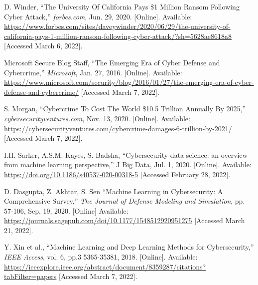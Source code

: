 \begin{thebibliography}{99}
    D. Winder, ``The University Of California Pays \$1 Million Ransom Following Cyber Attack,''
    \textit{forbes.com}, Jun. 29, 2020. [Online].
    Available: \href{https://www.forbes.com/sites/daveywinder/2020/06/29/the-university-of-california-pays-1-million-ransom-following-cyber-attack/?sh=5628ae8618a8}{https://www.forbes.com/sites/daveywinder/2020/06/29/the-university-of-california-pays-1-million-ransom-following-cyber-attack/?sh=5628ae8618a8}
    [Accessed March 6, 2022].

    Microsoft Secure Blog Staff, ``The Emerging Era of Cyber Defense and Cybercrime,''
    \textit{Microsoft}, Jan. 27, 2016. [Online].
    Available: \href{https://www.microsoft.com/security/blog/2016/01/27/the-emerging-era-of-cyber-defense-and-cybercrime/}{https://www.microsoft.com/security/blog/2016/01/27/the-emerging-era-of-cyber-defense-and-cybercrime/}
    [Accessed March 7, 2022].

    S. Morgan, ``Cybercrime To Cost The World \$10.5 Trillion Annually By 2025,''
    \textit{cybersecurityventures.com}, Nov. 13, 2020. [Online].
    Available: \href{https://cybersecurityventures.com/cybercrime-damages-6-trillion-by-2021/}{https://cybersecurityventures.com/cybercrime-damages-6-trillion-by-2021/}
    [Accessed March 7, 2022].

    I.H. Sarker, A.S.M. Kayes, S. Badsha, ``Cybersecurity data science: an overview from machine learning perspective,''
    J Big Data, Jul. 1, 2020. [Online].
    Available: \href{https://doi.org/10.1186/s40537-020-00318-5}{https://doi.org/10.1186/s40537-020-00318-5}
    [Accessed February 28, 2022].

    D. Dasgupta, Z. Akhtar, S. Sen ``Machine Learning in Cybersecurity: A Comprehensive Survey,''
    \textit{The Journal of Defense Modeling and Simulation}, pp. 57-106, Sep. 19, 2020. [Online]
    Available: \href{https://journals.sagepub.com/doi/10.1177/1548512920951275}{https://journals.sagepub.com/doi/10.1177/1548512920951275}
    [Accessed March 21, 2022].

    Y. Xin et al., ``Machine Learning and Deep Learning Methods for Cybersecurity,''
    \textit{IEEE Access}, vol. 6, pp.3 5365-35381, 2018. [Online].
    Available: \href{https://ieeexplore.ieee.org/abstract/document/8359287/citations?tabFilter=papers}{https://ieeexplore.ieee.org/abstract/document/8359287/citations?tabFilter=papers}
    [Accessed March 7, 2022].


\end{thebibliography}
